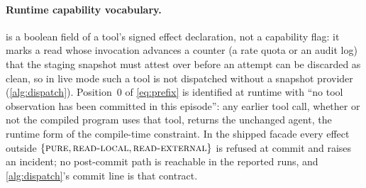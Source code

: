 \paragraph{Runtime capability vocabulary.}  is a boolean
field of a tool's signed effect declaration, not a capability flag: it marks a
read whose invocation advances a counter (a rate quota or an audit log) that
the staging snapshot must attest over before an attempt can be discarded as
clean, so in live mode such a tool is not dispatched without a snapshot
provider (\cref{alg:dispatch}). Position~0 of \cref{eq:prefix} is identified at
runtime with ``no tool observation has been committed in this episode'': any
earlier tool call, whether or not the compiled program uses that tool, returns
the unchanged agent, the runtime form of the compile-time 
constraint. In the shipped facade every effect outside
$\{\textsc{pure},\textsc{read-local},\textsc{read-external}\}$ is refused at
commit and raises an incident; no post-commit path is reachable in the
reported runs, and \cref{alg:dispatch}'s commit line is that contract.

